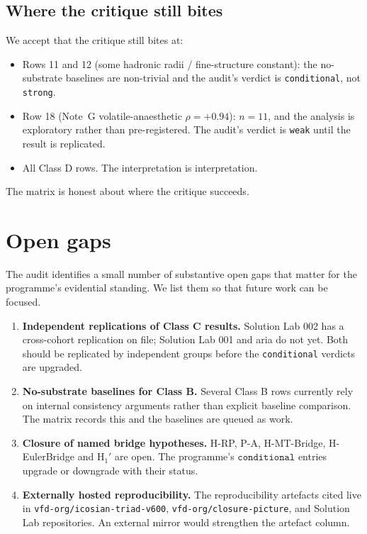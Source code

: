 \documentclass[11pt,a4paper]{article}
\begin{document}
\subsection{Where the critique still bites}

We accept that the critique still bites at:

\begin{itemize}[leftmargin=*]
  \item Rows 11 and 12 (some hadronic radii / fine-structure
        constant): the no-substrate baselines are non-trivial and
        the audit's verdict is \texttt{conditional}, not
        \texttt{strong}.
  \item Row 18 (Note~G volatile-anaesthetic $\rho=+0.94$): $n=11$,
        and the analysis is exploratory rather than
        pre-registered. The audit's verdict is \texttt{weak} until
        the result is replicated.
  \item All Class D rows. The interpretation is interpretation.
\end{itemize}

The matrix is honest about where the critique succeeds.

\section{Open gaps}
\label{sec:gaps}

The audit identifies a small number of substantive open gaps that
matter for the programme's evidential standing. We list them so
that future work can be focused.

\begin{enumerate}[leftmargin=*]
  \item \textbf{Independent replications of Class C results.}
        Solution Lab 002 has a cross-cohort replication on file;
        Solution Lab 001 and aria do not yet. Both should be
        replicated by independent groups before the
        \texttt{conditional} verdicts are upgraded.
  \item \textbf{No-substrate baselines for Class B.} Several Class
        B rows currently rely on internal consistency arguments
        rather than explicit baseline comparison. The matrix
        records this and the baselines are queued as work.
  \item \textbf{Closure of named bridge hypotheses.} H-RP, P-A,
        H-MT-Bridge, H-EulerBridge and H$_1'$ are open. The
        programme's $\texttt{conditional}$ entries upgrade or
        downgrade with their status.
  \item \textbf{Externally hosted reproducibility.} The
        reproducibility artefacts cited live in
        \texttt{vfd-org/icosian-triad-v600},
        \texttt{vfd-org/closure-picture}, and Solution Lab
        repositories. An external mirror would strengthen the
        artefact column.
\end{enumerate}
\end{document}
